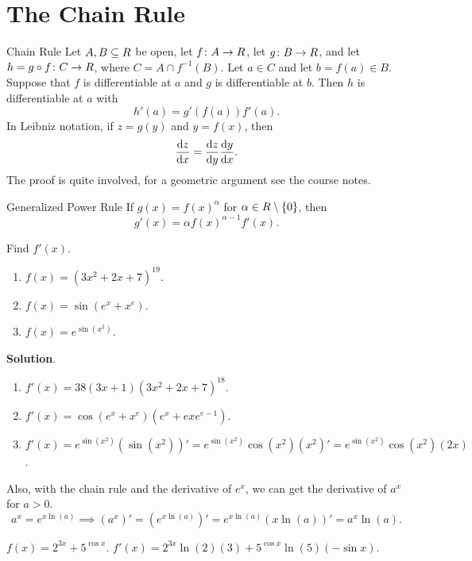 \section{The Chain Rule}
\begin{Theorem}{Chain Rule}{}
    Let $ A,B\subseteq \relax{R} $ be open, let $ f\colon A\to \relax{R} $, let $ g\colon B\to \relax{R} $, and let
    $ h=g\circ f\colon C\to \relax{R} $, where $ C=A\cap f^{-1}(B) $. Let $ a\in C $ and let $ b=f(a)\in B $. Suppose
    that $ f $ is differentiable at $ a $ and $ g $ is differentiable at $ b $. Then $ h $ is differentiable at $ a $ with
    \[ h'(a)=g'(f(a))f'(a). \]
    In Leibniz notation, if $ z=g(y) $ and $ y=f(x) $, then
    \[ \odv{z}{x}=\odv{z}{y}\odv{y}{x}. \]
    \tcblower{}
    The proof is quite involved, for a geometric argument see the course notes.
\end{Theorem}
\begin{Corollary}{Generalized Power Rule}{}
    If $ g(x)=f(x)^\alpha $ for $ \alpha\in\relax{R}\setminus \{0\} $, then
    \[ g'(x)=\alpha f(x)^{\alpha-1}f'(x). \]
\end{Corollary}
\begin{Example}{}{}
    Find $ f'(x) $.
    \begin{enumerate}[(1)]
        \item $ f(x)=(3x^2+2x+7)^{19} $.
        \item $ f(x)=\sin(e^x+x^e) $.
        \item $ f(x)=e^{\sin(x^2)} $.
    \end{enumerate}
    \tcblower{}
    \textbf{Solution}.
    \begin{enumerate}[(1)]
        \item $ f'(x)=38(3x+1)(3x^2+2x+7)^{18} $.
        \item $ f'(x)=\cos(e^x+x^e)(e^x+e xe^{e-1}) $.
        \item $ f'(x)=e^{\sin(x^2)}(\sin(x^2))'=e^{\sin(x^2)}\cos(x^2)(x^2)'=e^{\sin(x^2)}\cos(x^2)(2x) $.
    \end{enumerate}
\end{Example}
Also, with the chain rule and the derivative of $ e^x $, we can get the derivative of $ a^x $ for $ a>0 $.
\[ a^x=e^{x\ln(a)}\implies (a^x)'=(e^{x\ln(a)})'=e^{x\ln(a)}(x\ln(a))'=a^x\ln(a).  \]
\begin{Example}{}{}
    $ f(x)=2^{3x}+5^{\cos x} $. $ f'(x)=2^{3x}\ln(2)(3)+5^{\cos x}\ln(5)(-\sin x) $.
\end{Example}
